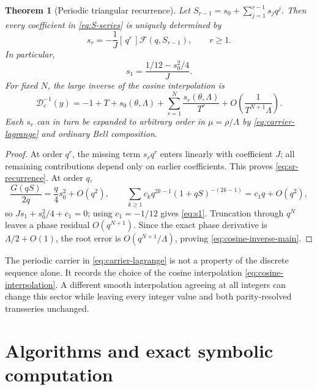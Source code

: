 \documentclass[11pt,oneside]{article}
\theoremstyle{plain}
\newtheorem{theorem}{Theorem}[section]
\theoremstyle{definition}
\theoremstyle{remark}
\newcommand{\coeff}[2]{[\,#1^{#2}\,]}
\newcommand{\Dc}{\mathcal D_{\!c}}
\begin{document}
\begin{theorem}[Periodic triangular recurrence]
\label{thm:periodic-recurrence}
Let
\(
 S_{r-1}=s_0+\sum_{j=1}^{r-1}s_jq^j
\).
Then every coefficient in \cref{eq:S-series} is uniquely determined by
\begin{equation}
 \boxed{
 s_r=-\frac1J\coeff{q}{r}\mathcal F(q,S_{r-1}),
 \qquad r\ge1.}
 \label{eq:sr-recurrence}
\end{equation}
In particular,
\begin{equation}
 s_1=\frac{1/12-s_0^2/4}{J}.
 \label{eq:s1}
\end{equation}
For fixed \(N\), the large inverse of the cosine interpolation is
\begin{equation}
 \boxed{
 \Dc^{-1}(y)
 =-1+T+s_0(\theta,\Lambda)
 +\sum_{r=1}^{N}\frac{s_r(\theta,\Lambda)}{T^r}
 +O\!\left(\frac1{T^{N+1}\Lambda}\right).}
 \label{eq:cosine-inverse-main}
\end{equation}
Each \(s_r\) can in turn be expanded to arbitrary order in
\(\mu=\rho/\Lambda\) by \cref{eq:carrier-lagrange} and ordinary Bell
composition.
\end{theorem}

\begin{proof}
At order \(q^r\), the missing term \(s_rq^r\) enters linearly with coefficient
\(J\); all remaining contributions depend only on earlier coefficients.  This
proves \cref{eq:sr-recurrence}.  At order \(q\),
\[
 \frac{G(qS)}{2q}=\frac q4s_0^2+O(q^2),
 \qquad
 \sum_{k\ge1}c_kq^{2k-1}(1+qS)^{-(2k-1)}=c_1q+O(q^2),
\]
so \(Js_1+s_0^2/4+c_1=0\); using \(c_1=-1/12\) gives
\cref{eq:s1}.  Truncation through \(q^N\) leaves a phase residual
\(O(q^{N+1})\).  Since the exact phase derivative is
\(\Lambda/2+O(1)\), the root error is
\(O(q^{N+1}/\Lambda)\), proving \cref{eq:cosine-inverse-main}.
\end{proof}

\begin{warningbox}
The periodic carrier in \cref{eq:carrier-lagrange} is not a property of the
discrete sequence alone.  It records the choice of the cosine interpolation
\cref{eq:cosine-interpolation}.  A different smooth interpolation agreeing at
all integers can change this sector while leaving every integer value and both
parity-resolved transseries unchanged.
\end{warningbox}

\section{Algorithms and exact symbolic computation}
\label{sec:algorithms}
\end{document}
